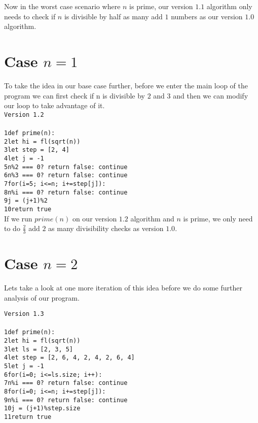 \documentclass[12pt]{article}
\def\code#1{\texttt{#1}}
\def\ph#1{\phantom{#1}}
\begin{document}
\noindent
Now in the worst case scenario where $n$ is prime, our version $1.1$ algorithm only needs to check if $n$ is divisible by half as many add $1$ numbers as our version $1.0$ algorithm.

\section{Case $n=1$}
To take the idea in our base case further, before we enter the main loop of the program we can first check if n is divisible by $2$ and $3$ and then we can modify our loop to take advantage of it.\\

\noindent
\code{Version 1.2}\\\\
\code{1\indent def prime(n):}\\
\code{2\indent\ph{..}let hi = fl(sqrt(n))}\\
\code{3\indent\ph{..}let step = [2, 4]}\\
\code{4\indent\ph{..}let j = -1}\\
\code{5\indent\ph{..}n\%2 === 0? return false: continue}\\
\code{6\indent\ph{..}n\%3 === 0? return false: continue}\\
\code{7\indent\ph{..}for(i=5; i<=n; i+=step[j]):}\\
\code{8\indent\ph{....}n\%i === 0? return false: continue}\\
\code{9\indent\ph{....}j = (j+1)\%2}\\
\code{10\indent\ph{.}return true}\\

\noindent
If we run $prime(n)$ on our version $1.2$ algorithm and $n$ is prime, we only need to do $\frac{2}{3}$ add $2$ as many divisibility checks as version $1.0$.

\section{Case $n=2$}
Lets take a look at one more iteration of this idea before we do some further analysis of our program.

\noindent
\code{Version 1.3}\\\\
\code{1\indent def prime(n):}\\
\code{2\indent\ph{..}let hi = fl(sqrt(n))}\\
\code{3\indent\ph{..}let ls = [2, 3, 5]}\\
\code{4\indent\ph{..}let step = [2, 6, 4, 2, 4, 2, 6, 4]}\\
\code{5\indent\ph{..}let j = -1}\\
\code{6\indent\ph{..}for(i=0; i<=ls.size; i++):}\\
\code{7\indent\ph{....}n\%i === 0? return false: continue}\\
\code{8\indent\ph{..}for(i=0; i<=n; i+=step[j]):}\\
\code{9\indent\ph{....}n\%i === 0? return false: continue}\\
\code{10\indent\ph{...}j = (j+1)\%step.size}\\
\code{11\indent\ph{...}return true}\\
\end{document}
